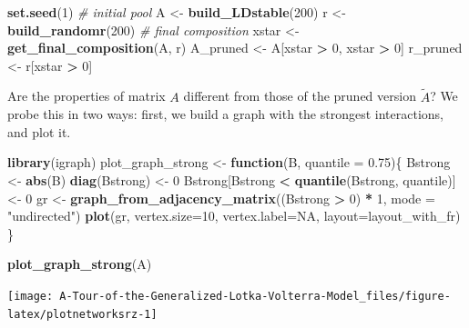\documentclass[
]{book}
\newenvironment{Shaded}{\begin{snugshade}}{\end{snugshade}}
\newcommand{\CommentTok}[1]{\textcolor[rgb]{0.56,0.35,0.01}{\textit{#1}}}
\newcommand{\ControlFlowTok}[1]{\textcolor[rgb]{0.13,0.29,0.53}{\textbf{#1}}}
\newcommand{\DataTypeTok}[1]{\textcolor[rgb]{0.13,0.29,0.53}{#1}}
\newcommand{\DecValTok}[1]{\textcolor[rgb]{0.00,0.00,0.81}{#1}}
\newcommand{\FloatTok}[1]{\textcolor[rgb]{0.00,0.00,0.81}{#1}}
\newcommand{\KeywordTok}[1]{\textcolor[rgb]{0.13,0.29,0.53}{\textbf{#1}}}
\newcommand{\NormalTok}[1]{#1}
\newcommand{\OperatorTok}[1]{\textcolor[rgb]{0.81,0.36,0.00}{\textbf{#1}}}
\newcommand{\OtherTok}[1]{\textcolor[rgb]{0.56,0.35,0.01}{#1}}
\newcommand{\StringTok}[1]{\textcolor[rgb]{0.31,0.60,0.02}{#1}}
\begin{document}
\begin{Shaded}
\begin{Highlighting}[]
\KeywordTok{set.seed}\NormalTok{(}\DecValTok{1}\NormalTok{)}
\CommentTok{# initial pool}
\NormalTok{A <-}\StringTok{ }\KeywordTok{build_LDstable}\NormalTok{(}\DecValTok{200}\NormalTok{)}
\NormalTok{r <-}\StringTok{ }\KeywordTok{build_randomr}\NormalTok{(}\DecValTok{200}\NormalTok{)}
\CommentTok{# final composition}
\NormalTok{xstar <-}\StringTok{ }\KeywordTok{get_final_composition}\NormalTok{(A, r)}
\NormalTok{A_pruned <-}\StringTok{ }\NormalTok{A[xstar }\OperatorTok{>}\StringTok{ }\DecValTok{0}\NormalTok{, xstar }\OperatorTok{>}\StringTok{ }\DecValTok{0}\NormalTok{]}
\NormalTok{r_pruned <-}\StringTok{ }\NormalTok{r[xstar }\OperatorTok{>}\StringTok{ }\DecValTok{0}\NormalTok{]}
\end{Highlighting}
\end{Shaded}

Are the properties of matrix \(A\) different from those of the pruned version \(\tilde{A}\)? We probe this in two ways: first, we build a graph with the strongest interactions, and plot it.

\begin{Shaded}
\begin{Highlighting}[]
\KeywordTok{library}\NormalTok{(igraph)}
\NormalTok{plot_graph_strong <-}\StringTok{ }\ControlFlowTok{function}\NormalTok{(B, }\DataTypeTok{quantile =} \FloatTok{0.75}\NormalTok{)\{}
\NormalTok{  Bstrong <-}\StringTok{ }\KeywordTok{abs}\NormalTok{(B)}
  \KeywordTok{diag}\NormalTok{(Bstrong) <-}\StringTok{ }\DecValTok{0}
\NormalTok{  Bstrong[Bstrong }\OperatorTok{<}\StringTok{ }\KeywordTok{quantile}\NormalTok{(Bstrong, quantile)] <-}\StringTok{ }\DecValTok{0}
\NormalTok{  gr <-}\StringTok{ }\KeywordTok{graph_from_adjacency_matrix}\NormalTok{((Bstrong }\OperatorTok{>}\StringTok{ }\DecValTok{0}\NormalTok{) }\OperatorTok{*}\StringTok{ }\DecValTok{1}\NormalTok{, }\DataTypeTok{mode =} \StringTok{"undirected"}\NormalTok{)}
  \KeywordTok{plot}\NormalTok{(gr, }\DataTypeTok{vertex.size=}\DecValTok{10}\NormalTok{, }\DataTypeTok{vertex.label=}\OtherTok{NA}\NormalTok{, }\DataTypeTok{layout=}\NormalTok{layout_with_fr)}
\NormalTok{\}}

\KeywordTok{plot_graph_strong}\NormalTok{(A)}
\end{Highlighting}
\end{Shaded}

\begin{center}\texttt{[image: A-Tour-of-the-Generalized-Lotka-Volterra-Model\_files/figure-latex/plotnetworksrz-1]} \end{center}
\end{document}
